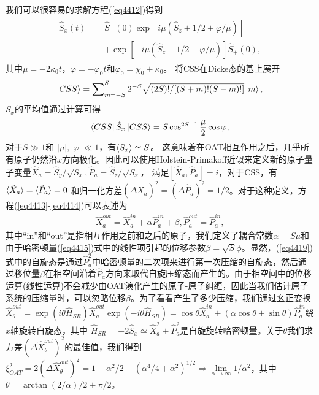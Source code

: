 我们可以很容易的求解方程(\ref{eq4412})得到
\begin{align}\label{eq4416}
\begin{split}
{{\hat S}_x}(t) =& {{\hat S}_ + }(0)\exp [i\mu ({{\hat S}_z} + 1/2 + \varphi /\mu )] \\
&+ \exp [ - i\mu ({{\hat S}_z} + 1/2 + \varphi /\mu )]{{\hat S}_ + }(0),
\end{split}
\end{align}
其中$\mu = -2\kappa_0 t$，$\varphi = -\varphi_0 t$和$\varphi_0=\chi_0+\kappa_0$。
将CSS在Dicke态的基上展开
\begin{align}
\ket{CSS} = \sum\nolimits_{m=-S}^S 2^{ - S}\sqrt {(2S)!/[(S + m)!(S - m)!]}\ket{m},\label{eq4417}
\end{align}
$S_x$的平均值通过计算可得
\begin{align}
\bra{CSS}\hat {S}_x\ket{CSS}=S \cos^{2S-1}{\frac {\mu}2} \cos{ \varphi },\label{eq4418}
\end{align}
对于$S\gg 1$和 $|\mu|,|\varphi|\ll1 $，有$\braket{S_x}\simeq S$。
这意味着在OAT相互作用之后，几乎所有原子仍然沿$x$方向极化。因此可以使用Holstein-Primakoff近似\cite{PhysRevA.58.1098}来定义新的原子量子变量$\hat {X}_a = {\hat S_y}/\sqrt {S_x} ,{\hat P_a} = {\hat S_z}/\sqrt {S_x} $，
满足$[\hat {X}_a,\hat {P}_a] = i$，对于CSS，有$\braket{\hat {X}_a}=\braket{\hat {P}_a}=0$
和归一化方差$(\Delta {\hat X}_a)^2 =(\Delta {\hat P}_a)^2= 1/2$。对于这种定义，方程(\ref{eq4413}-\ref{eq4414})可以表述为
\begin{align}
\hat X_a^{out} = \hat X_a^{in} + \alpha \hat P_a^{in} + \beta ,\hat P_a^{out} = \hat P_a^{in},\label{eq4419}
\end{align}
其中“in”和“out”是指相互作用之前和之后的原子，我们定义了耦合常数$\alpha=S\mu$和由于哈密顿量(\ref{eq4415})式中的线性项引起的位移参数$\beta=\sqrt{S}\phi$。显然，(\ref{eq4419})式中的自旋态是通过$\hat{P}_a^2$中哈密顿量的二次项来进行第一次压缩的自旋态，然后通过移位量$\beta$在相空间沿着$\hat{P}_a$方向来取代自旋压缩态而产生的。由于相空间中的位移运算(线性运算)不会减少由OAT演化\cite{RevModPhys.77.513}产生的原子-原子纠缠，因此当我们估计原子系统的压缩量时，可以忽略位移$\beta$。为了看看产生了多少压缩，我们通过幺正变换$\hat X_\theta^{out}=\exp(i\theta\hat H_{SR}) \hat X_a^{out}\exp(-i\theta\hat H_{SR})=\cos{\theta} \hat X_a^{in}+(\alpha\cos{\theta}+\sin{\theta})\hat P_a^{in}$绕$x$轴旋转自旋态，其中 $\hat H_{SR}=-2\hat S_x\simeq \hat X_a^2+\hat P_a^2$是自旋旋转哈密顿量\cite{PhysRevLett.91.060401}。关于$\theta$我们求方差$(\Delta\hat X_\theta^{out})^2$的最佳值，我们得到$\xi_{OAT}^2=2(\Delta\hat X_\theta^{out})^2=1+\alpha^2/2-(\alpha^4/4+\alpha^2)^{1/2}\Rightarrow \mathop{\lim}\limits_{\alpha\rightarrow \infty}1/\alpha^2$，其中$\theta=\arctan (2/\alpha)/2+\pi/2$。

